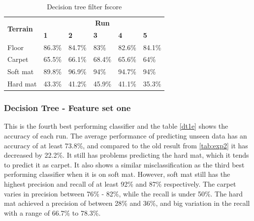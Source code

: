 \documentclass[USenglish]{ifimaster}  %
\begin{document}
	\begin{table}[h]
		\centering
		\begin{tabular}{@{}llllll@{}}
			\toprule
			\multirow{2}{*}{\textbf{Terrain}} & \multicolumn{5}{c}{\textbf{Run}} \\ \cmidrule(l){2-6} 
			& \multicolumn{1}{l|}{\textbf{1}} & \multicolumn{1}{l|}{\textbf{2}} & \multicolumn{1}{l|}{\textbf{3}} & \multicolumn{1}{l|}{\textbf{4}} & \textbf{5} \\ \midrule
			\multicolumn{1}{l|}{Floor} & \multicolumn{1}{l|}{86.3\%} & \multicolumn{1}{l|}{84.7\%} & \multicolumn{1}{l|}{83\%} & \multicolumn{1}{l|}{82.6\%} & 84.1\% \\ \midrule
			\multicolumn{1}{l|}{Carpet} & \multicolumn{1}{l|}{65.5\%} & \multicolumn{1}{l|}{66.1\%} & \multicolumn{1}{l|}{68.4\%} & \multicolumn{1}{l|}{65.6\%} & 64\% \\ \midrule
			\multicolumn{1}{l|}{Soft mat} & \multicolumn{1}{l|}{89.8\%} & \multicolumn{1}{l|}{96.9\%} & \multicolumn{1}{l|}{94\%} & \multicolumn{1}{l|}{94.7\%} & 94\% \\ \midrule
			\multicolumn{1}{l|}{Hard mat} & \multicolumn{1}{l|}{43.3\%} & \multicolumn{1}{l|}{41.2\%} & \multicolumn{1}{l|}{45.9\%} & \multicolumn{1}{l|}{41.1\%} & 35.3\% \\ \bottomrule
		\end{tabular}
		\caption{Decision tree filter fscore}
		\label{dtfilterfscore}
	\end{table}
	\FloatBarrier
	\newpage

\subsubsection{Decision Tree - Feature set one}
This is the fourth best performing classifier and the table \ref{dt1e} shows the accuracy of each run. The average performance of predicting unseen data has an accuracy of at least 73.8\%, and compared to the old result from \ref{tab:exp2} it has decreased by 22.2\%. It still has problems predicting the hard mat, which it tends to predict it as carpet. It also shows a similar misclassification as the third best performing classifier when it is on soft mat. However, soft mat still has the highest precision and recall of at least 92\% and 87\% respectively. The carpet varies in precision between 76\% - 82\%, while the recall is under 50\%. The hard mat achieved a precision of between 28\% and 36\%, and big variation in the recall with a range of 66.7\% to 78.3\%.
\end{document}
